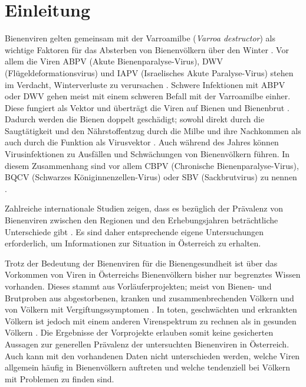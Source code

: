 \section{Einleitung}

Bienenviren gelten gemeinsam mit der Varroamilbe (\textit{Varroa destructor}) als wichtige Faktoren für das Absterben von Bienenvölkern über den Winter \citep{carreck2010,genersch2010,dainat2012}. Vor allem die Viren ABPV (Akute Bienenparalyse-Virus), DWV (Flügeldeformationsvirus) und IAPV (Israelisches Akute Paralyse-Virus) stehen im Verdacht, Winterverluste zu verursachen \citep{coxfoster2007,berthoud2010,genersch2010}. Schwere Infektionen mit ABPV oder DWV gehen meist mit einem schweren Befall mit der Varroamilbe einher. Diese fungiert als Vektor und überträgt die Viren auf Bienen und Bienenbrut \citep{bowen-walker1999,chen2004}. Dadurch werden die Bienen doppelt geschädigt; sowohl direkt durch die Saugtätigkeit und den Nährstoffentzug durch die Milbe und ihre Nachkommen als auch durch die Funktion als Virusvektor \citep{amdam2004,highfield2009}. Auch während des Jahres können Virusinfektionen zu Ausfällen und Schwächungen von Bienenvölkern führen. In diesem Zusammenhang sind vor allem CBPV (Chronische Bienenparalyse-Virus), BQCV (Schwarzes Königinnenzellen-Virus) oder SBV (Sackbrutvirus) zu nennen \citep{chen2007,ribiere2010,roy2015}.

Zahlreiche internationale Studien zeigen, dass es bezüglich der Prävalenz von Bienenviren zwischen den Regionen und den Erhebungsjahren beträchtliche Unterschiede gibt \citep{tentcheva2004,genersch2010,traynor2016}. Es sind daher entsprechende eigene Untersuchungen erforderlich, um Informationen zur Situation in Österreich zu erhalten. 

Trotz der Bedeutung der Bienenviren für die Bienengesundheit ist über das Vorkommen von Viren in Österreichs Bienenvölkern bisher nur begrenztes Wissen vorhanden. Dieses stammt aus Vorläuferprojekten; meist von Bienen- und Brutproben aus abgestorbenen, kranken und zusammenbrechenden Völkern und von Völkern mit Vergiftungssymptomen \citep{berenyi2006,köglberger2009,girsch2012,moosbeckhofer2014}. In toten, geschwächten und erkrankten Völkern ist jedoch mit einem anderen Virenspektrum zu rechnen als in gesunden Völkern \citep{amiri2015,morawetz2018}. Die Ergebnisse der Vorprojekte erlauben somit keine gesicherten Aussagen zur generellen Prävalenz der untersuchten Bienenviren in Österreich. Auch kann mit den vorhandenen Daten nicht unterschieden werden, welche Viren allgemein häufig in Bienenvölkern auftreten und welche tendenziell bei Völkern mit Problemen zu finden sind. 

